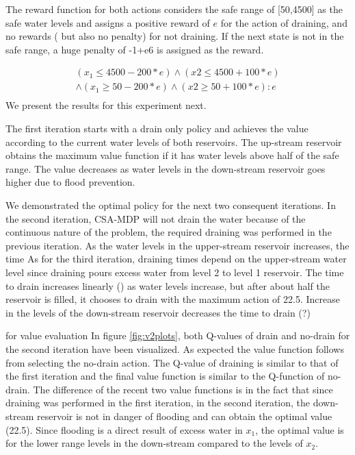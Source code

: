 The reward function for both actions considers the safe range of [50,4500] as the safe water levels and assigns a positive reward of $e$ for the action of draining, and no rewards ( but also no penalty) for not draining. If the next state is not in the safe range, a huge penalty of -1+e6 is assigned as the reward.

{\footnotesize
\begin{align*}
(x_1\leq 4500 - 200 * e) \wedge (x2 \leq 4500 +100 *e) \\
\wedge (x_1\geq 50 - 200 * e) \wedge (x2 \geq 50 +100 *e) : e \\
\end{align*}
}
We present the results for this experiment next. 

The first iteration starts with a drain only policy and achieves the value according to the current water levels of both reservoirs. The up-stream reservoir obtains the maximum value function if it has water levels above half of the safe range. The value decreases as water levels in the down-stream reservoir goes higher due to flood prevention. 

We demonstrated the optimal policy for the next two consequent iterations. In the second iteration, CSA-MDP will not drain the water because of the continuous nature of the problem, the required draining was performed in the previous iteration. As the water levels in the upper-stream reservoir increases, the time 
As for the third iteration, draining times depend on the upper-stream water level since draining pours excess water from level 2 to level 1 reservoir. The time to drain increases linearly () as water levels increase, but after about half the reservoir is filled, it chooses to drain with the maximum action of 22.5. Increase in the levels of the down-stream reservoir decreases the time to drain (?)  

for value evaluation
In figure \ref{fig:v2plots}, both Q-values of drain and no-drain for the second iteration have been visualized. As expected the value function follows from selecting the no-drain action. The Q-value of draining is similar to that of the first iteration and the final value function is similar to the Q-function of no-drain. The difference of the recent two value functions is in the fact that since draining was performed in the first iteration, in the second iteration, the down-stream reservoir is not in danger of flooding and can obtain the optimal value (22.5). Since flooding is a direct result of excess water in $x_1$, the optimal value is for the lower range levels in the down-stream compared to the levels of $x_2$. 


